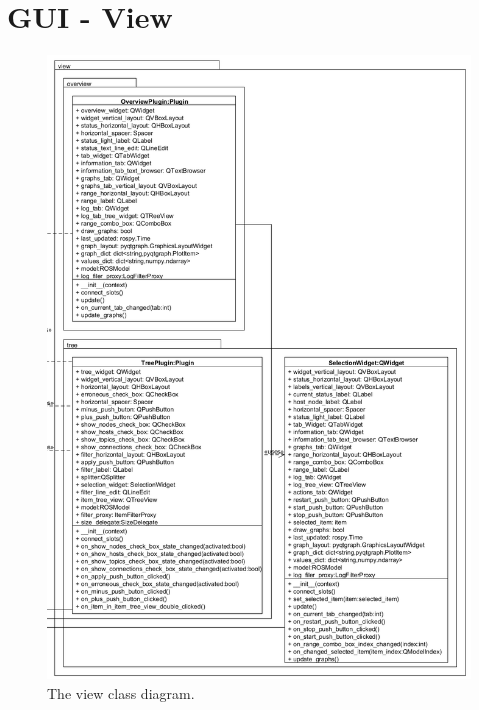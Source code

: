 \section{GUI - View}
\begin{figure}[!ht]
\begin{center}
\includegraphics[width=0.8\linewidth]{./diagram_pictures/view.png}
\caption{The view class diagram.}
\end{center}
\end{figure}


